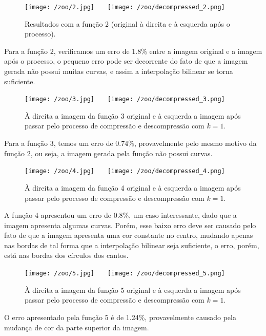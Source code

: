 \documentclass{article}
\begin{document}
		\begin{figure}[H]
			\centering
			\captionsetup{justification=centering}
			\texttt{[image: /zoo/2.jpg]} \ \ \
			\texttt{[image: /zoo/decompressed\_2.png]} \\
			\caption{Resultados com a função 2 (original à direita e à esquerda após o processo).}  
		\end{figure}\par
		Para a função 2, verificamos um erro de 1.8\% entre a imagem original e a imagem após o processo, o pequeno erro pode ser decorrente do fato de que a imagem gerada não possui muitas curvas, e assim a interpolação bilinear se torna suficiente.\par
		
		\begin{figure}[H]
			\centering
			\captionsetup{justification=centering}
			\texttt{[image: /zoo/3.jpg]} \ \ \
			\texttt{[image: /zoo/decompressed\_3.png]} \\
			\caption{À direita a imagem da função 3 original e à esquerda a imagem após passar pelo processo de compressão e descompressão com $k = 1$.}  
			\label{func3}
		\end{figure}\par
		Para a função 3, temos um erro de 0.74\%, provavelmente pelo mesmo motivo da função 2, ou seja, a imagem gerada pela função não possui curvas.
		
		\begin{figure}[H]
			\centering
			\captionsetup{justification=centering}
			\texttt{[image: /zoo/4.jpg]} \ \ \
			\texttt{[image: /zoo/decompressed\_4.png]} \\
			\caption{À direita a imagem da função 4 original e à esquerda a imagem após passar pelo processo de compressão e descompressão com $k = 1$.}  
		\end{figure}\par
		A função 4 apresentou um erro de 0.8\%, um caso interessante, dado que a imagem apresenta algumas curvas. Porém, esse baixo erro deve ser causado pelo fato de que a imagem apresenta uma cor constante no centro, mudando apenas nas bordas de tal forma que a interpolação bilinear seja suficiente, o erro, porém, está nas bordas dos círculos dos cantos.
		
		\begin{figure}[H]
			\centering
			\captionsetup{justification=centering}
			\texttt{[image: /zoo/5.jpg]} \ \ \
			\texttt{[image: /zoo/decompressed\_5.png]} \\
			\caption{À direita a imagem da função 5 original e à esquerda a imagem após passar pelo processo de compressão e descompressão com $k = 1$.}  
		\end{figure}\par
		O erro apresentado pela função 5 é de 1.24\%, provavelmente causado pela mudança de cor da parte superior da imagem.
		
\end{document}
